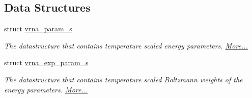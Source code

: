 \subsection*{Data Structures}
\begin{DoxyCompactItemize}
\item 
struct \hyperlink{group__energy__parameters_structvrna__param__s}{vrna\+\_\+param\+\_\+s}
\begin{DoxyCompactList}\small\item\em The datastructure that contains temperature scaled energy parameters.  \hyperlink{group__energy__parameters_structvrna__param__s}{More...}\end{DoxyCompactList}\item 
struct \hyperlink{group__energy__parameters_structvrna__exp__param__s}{vrna\+\_\+exp\+\_\+param\+\_\+s}
\begin{DoxyCompactList}\small\item\em The datastructure that contains temperature scaled Boltzmann weights of the energy parameters.  \hyperlink{group__energy__parameters_structvrna__exp__param__s}{More...}\end{DoxyCompactList}\end{DoxyCompactItemize}

